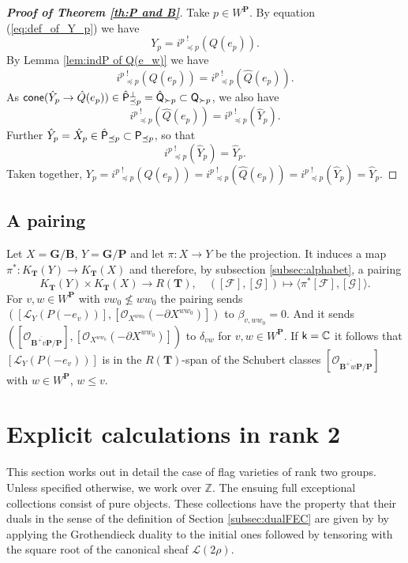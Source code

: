 \documentclass[sn-mathphys-num]{sn-jnl}%
\newcommand\F{{\mathcal F}}
\newcommand\G{{\mathcal G}}
\newcommand{\Oo}{\mathcal O}
\newcommand{\Ll}{\mathcal L}
\newcommand{\sk}{{\sf k}}
\newcommand{\cC}{{\mathbb C}}
\newcommand{\bg}{\mathbf G}
\newcommand{\fb}{\mathbf B}
\newcommand{\bt}{\mathbf T}
\newcommand{\bp}{\mathbf P}
\newcommand{\fX}{{ X}}
\theoremstyle{definition}
\begin{document}
\begin{proof}[\rm\bf Proof of Theorem \ref{th:P and B}]
Take $p\in W^\bp$. By equation (\ref{eq:def_of_Y_p}) we have 
\begin{equation}
    Y_p={i^p}_{\preceq p}^{\ !}(Q(e_p)).
\end{equation}
 By Lemma \ref{lem:indP of Q(e_w)} we have 
\begin{equation}
{i^p}_{\preceq p}^{\ !}(Q(e_p))={i^p}_{\preceq p}^{\ !}(\hat Q(e_p)).\end{equation}
As ${\sf cone}(\hat Y_p\rightarrow \hat Q(e_p))\in \hat{\sf P}_{\preceq p}^{\perp}=
\hat{\sf Q}_{\succ p}\subset  {\sf Q}_{\succ p}$, we also have \begin{equation}
{i^p}_{\preceq p}^{\ !}(\hat Q(e_p))={i^p}_{\preceq p}^{\ !}(\hat Y_p).    
\end{equation} 
Further $\hat Y_p=\hat X_p\in \hat{\sf P}_{\preceq p}\subset {\sf P}_{\preceq p}$, so that 
\begin{equation}
{i^p}_{\preceq p}^{\ !}(\hat Y_p)=\hat Y_p.    
\end{equation}
Taken together, 
$Y_p={i^p}_{\preceq p}^{\ !}(Q(e_p))={i^p}_{\preceq p}^{\ !}(\hat Q(e_p))={i^p}_{\preceq p}^{\ !}(\hat Y_p)=\hat Y_p$.
\end{proof}

\subsection{A pairing}
Let $X=\bg/\fb$, $Y=\bg/\bp$ and let $\pi:X\to Y$ be the  projection. It induces a
map\\ $\pi^*:K_\bt(Y)\to K_\bt(X)$ and therefore, by subsection \ref{subsec:alphabet}, a pairing 
$$K_\bt(Y)\times K_\bt(X)\to R(\bt), \quad ([\F],[\G])\mapsto \langle \pi^*[\F],[\G]\rangle.$$
For $v,w\in W^\bp$ with $vw_0\not\leq ww_0$
the pairing sends $([\Ll_Y(P(-e_v))],[\Oo_{\fX^{ww_0}}(-\partial \fX^{ww_0})])$ to $\beta_{v,ww_0}=0$.
And it sends $([\Oo_{\overline{\fb^+v\bp}/\bp}],[\Oo_{\fX^{ww_0}}(-\partial \fX^{ww_0})])$ to $\delta_{vw}$ for $v,w\in W^\bp$.
If $\sk=\cC$ it follows  that $[\Ll_Y(P(-e_v))]$ is in the $R(\bt)$-span of the Schubert classes $[\Oo_{\overline{\fb^+w\bp}/\bp}]$ with $w\in W^\bp$, $w\leq v$.


\section{Explicit calculations in rank 2}\label{sec:rank_2}
This section works out in detail the case of flag varieties of rank two groups. Unless 
specified otherwise, we work over $\mathbb Z$. The ensuing full exceptional collections consist of pure objects. These collections have the property that their duals in the sense of the definition of Section \ref{subsec:dualFEC} are given by by applying the Grothendieck duality to the initial ones followed by tensoring with the square root of the canonical sheaf $\Ll (2\rho)$.
\end{document}
